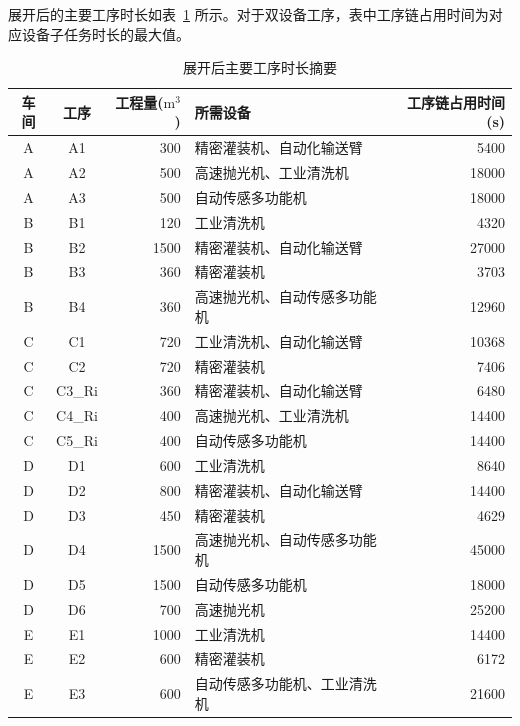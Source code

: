 展开后的主要工序时长如表~\ref{tab:process-duration} 所示。对于双设备工序，表中工序链占用时间为对应设备子任务时长的最大值。

\begin{table}[!htbp]
  \centering
  \caption{展开后主要工序时长摘要}
  \label{tab:process-duration}
  \small
  \renewcommand{\arraystretch}{1.18}
  \begin{tabularx}{\textwidth}{c c r X r}
    \toprule
    车间 & 工序 & 工程量($\mathrm{m^3}$) & 所需设备 & 工序链占用时间(s) \\
    \midrule
    A & A1 & 300 & 精密灌装机、自动化输送臂 & 5400 \\
    A & A2 & 500 & 高速抛光机、工业清洗机 & 18000 \\
    A & A3 & 500 & 自动传感多功能机 & 18000 \\
    B & B1 & 120 & 工业清洗机 & 4320 \\
    B & B2 & 1500 & 精密灌装机、自动化输送臂 & 27000 \\
    B & B3 & 360 & 精密灌装机 & 3703 \\
    B & B4 & 360 & 高速抛光机、自动传感多功能机 & 12960 \\
    C & C1 & 720 & 工业清洗机、自动化输送臂 & 10368 \\
    C & C2 & 720 & 精密灌装机 & 7406 \\
    C & C3\_Ri & 360 & 精密灌装机、自动化输送臂 & 6480 \\
    C & C4\_Ri & 400 & 高速抛光机、工业清洗机 & 14400 \\
    C & C5\_Ri & 400 & 自动传感多功能机 & 14400 \\
    D & D1 & 600 & 工业清洗机 & 8640 \\
    D & D2 & 800 & 精密灌装机、自动化输送臂 & 14400 \\
    D & D3 & 450 & 精密灌装机 & 4629 \\
    D & D4 & 1500 & 高速抛光机、自动传感多功能机 & 45000 \\
    D & D5 & 1500 & 自动传感多功能机 & 18000 \\
    D & D6 & 700 & 高速抛光机 & 25200 \\
    E & E1 & 1000 & 工业清洗机 & 14400 \\
    E & E2 & 600 & 精密灌装机 & 6172 \\
    E & E3 & 600 & 自动传感多功能机、工业清洗机 & 21600 \\
    \bottomrule
  \end{tabularx}
\end{table}

